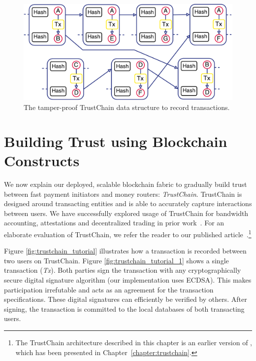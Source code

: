 \begin{figure}[b]
	\centering
	\includegraphics[width=.9\linewidth]{iom/assets/trustchain}
	\caption{The tamper-proof TrustChain data structure to record transactions.}
	\label{fig:trustchain}
\end{figure}

\section{Building Trust using Blockchain Constructs}
\label{sec:trust}
We now explain our deployed, scalable blockchain fabric to gradually build trust between fast payment initiators and money routers: \emph{TrustChain}.
TrustChain is designed around transacting entities and is able to accurately capture interactions between users.
We have successfully explored usage of TrustChain for bandwidth accounting, attestations and decentralized trading in prior work~\cite{pouwelse2017laws}. %
For an elaborate evaluation of TrustChain, we refer the reader to our published article~\cite{otte2017trustchain}.\footnote{The TrustChain architecture described in this chapter is an earlier version of \TrustChain{}, which has been presented in Chapter~\ref{chapter:trustchain}.}

Figure \ref{fig:trustchain_tutorial} illustrates how a transaction is recorded between two users on TrustChain.
Figure \ref{fig:trustchain_tutorial_1} shows a single transaction (\emph{Tx}).
Both parties sign the transaction with any cryptographically secure digital signature algorithm (our implementation uses ECDSA).
This makes participation irrefutable and acts as an agreement for the transaction specifications.
These digital signatures can efficiently be verified by others.
After signing, the transaction is committed to the local databases of both transacting users.

